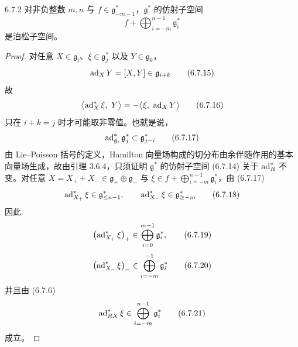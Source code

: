 \begin{corollary*}{6.7.2}
  对非负整数 $m,n$ 与 $f\in\mathfrak{g}^*_{-m-1}$，$\mathfrak{g}^*$ 的仿射子空间
  \begin{equation}
    f + \bigoplus_{i=-m}^{n-1}\mathfrak{g}^*_i
    \tag{6.7.14}
  \end{equation}
  是泊松子空间。
\end{corollary*}

\begin{proof}
  对任意 $X\in\mathfrak{g}_i$、$\xi\in\mathfrak{g}^*_j$ 以及 $Y\in\mathfrak{g}_k$，
  \begin{equation}
    \operatorname{ad}_XY = [X,Y]\in\mathfrak{g}_{i+k}
    \tag{6.7.15}
  \end{equation}
  故
  \begin{equation}
    \bigl\langle \operatorname{ad}^*_X\xi,\ Y\bigr\rangle = -\bigl\langle \xi,\ \operatorname{ad}_XY\bigr\rangle
    \tag{6.7.16}
  \end{equation}
  只在 $i+k=j$ 时才可能取非零值。也就是说，
  \begin{equation}
    \operatorname{ad}^*_{\mathfrak{g}_i}\mathfrak{g}^*_j \subset \mathfrak{g}^*_{j-i}
    \tag{6.7.17}
  \end{equation}
  由 Lie--Poisson 括号的定义，Hamilton 向量场构成的切分布由余伴随作用的基本向量场生成，故由引理 3.6.4，只须证明 $\mathfrak{g}^*$ 的仿射子空间 (6.7.14) 关于 $\operatorname{ad}^*_R$ 不变。对任意 $X=X_++X_-\in\mathfrak{g}_+\oplus\mathfrak{g}_-$ 与 $\xi\in f+\bigoplus_{i=-m}^{n-1}\mathfrak{g}^*_i$，由 (6.7.17)
  \begin{equation}
    \operatorname{ad}^*_{X_+}\xi\in\mathfrak{g}^*_{\le n-1},\qquad
    \operatorname{ad}^*_{X_-}\xi\in\mathfrak{g}^*_{\ge -m}
    \tag{6.7.18}
  \end{equation}
  因此
  \begin{equation}
    \bigl(\operatorname{ad}^*_{X_+}\xi\bigr)_+ \in \bigoplus_{i=0}^{m-1}\mathfrak{g}^*_i,
    \tag{6.7.19}
  \end{equation}
  \begin{equation}
    \bigl(\operatorname{ad}^*_{X_-}\xi\bigr)_- \in \bigoplus_{i=-m}^{-1}\mathfrak{g}^*_i
    \tag{6.7.20}
  \end{equation}
  并且由 (6.7.6)
  \begin{equation}
    \operatorname{ad}^*_{RX}\xi \in \bigoplus_{i=-m}^{n-1}\mathfrak{g}^*_i
    \tag{6.7.21}
  \end{equation}
  成立。
\end{proof}

